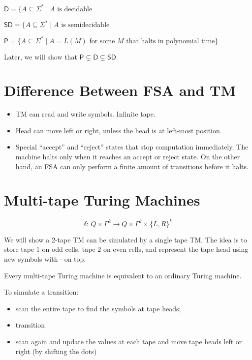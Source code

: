 $\textsf{D} = \{ A \subseteq \Sigma^* \mid \text{$A$ is decidable}$

$\textsf{SD} = \{A \subseteq \Sigma^* \mid \text{$A$ is semidecidable}$

$\textsf{P} = \{A \subseteq \Sigma^* \mid \text{$A=L(M)$ for some $M$ that halts in polynomial time} \}$

Later, we will show that $\textsf{P} \subsetneq \textsf{D} \subsetneq \textsf{SD}$.

\section{Difference Between FSA and TM}

\begin{itemize}
    \item TM can read and write symbols. Infinite tape.
    \item Head can move left or right, unless the head is at left-most position.
    \item Special ``accept'' and ``reject'' states that stop computation immediately. The machine halts only when it reaches an accept or reject state. On the other hand, an FSA can only perform a finite amount of transitions before it halts.
\end{itemize}

\section{Multi-tape Turing Machines}

$$
\delta:\, Q \times \Gamma^k \to Q \times \Gamma^k \times \{L,R\}^k
$$

We will show a 2-tape TM can be simulated by a single tape TM. The idea is to store tape 1 on odd cells, tape 2 on even cells, and represent the tape head using new symbols with $\cdot$ on top. 

\begin{theorem}
    Every multi-tape Turing machine is equivalent to an ordinary Turing machine.
\end{theorem}

To simulate a transition:
\begin{itemize}
    \item scan the entire tape to find the symbols at tape heads;
    \item transition
    \item scan again and update the values at each tape and move tape heads left or right (by shifting the dots)
\end{itemize}

